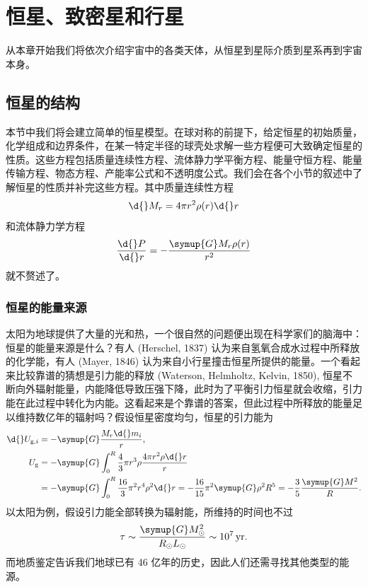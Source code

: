 \documentclass[../天体物理基础.tex]{subfiles}
\begin{document}
\section{恒星、致密星和行星}
从本章开始我们将依次介绍宇宙中的各类天体，从恒星到星际介质到星系再到宇宙本身。

\subsection{恒星的结构}
本节中我们将会建立简单的恒星模型。在球对称的前提下，给定恒星的初始质量，化学组成和边界条件，在某一特定半径的球壳处求解一些方程便可大致确定恒星的性质。这些方程包括质量连续性方程、流体静力学平衡方程、能量守恒方程、能量传输方程、物态方程、产能率公式和不透明度公式。我们会在各个小节的叙述中了解恒星的性质并补完这些方程。其中质量连续性方程
\begin{equation}
\d{}M_{r}=4\pi r^{2}\rho\mleft(r\mright)\d{}r
\end{equation}
和流体静力学方程
\begin{equation}
\frac{\d{}P}{\d{}r}=-\frac{\symup{G}M_{r}\rho\mleft(r\mright)}{r^{2}}\label{2.1.2}
\end{equation}
就不赘述了。

\subsubsection{恒星的能量来源}
太阳为地球提供了大量的光和热，一个很自然的问题便出现在科学家们的脑海中：恒星的能量来源是什么？有人 (Herschel, 1837) 认为来自氢氧合成水过程中所释放的化学能，有人 (Mayer, 1846) 认为来自小行星撞击恒星所提供的能量。一个看起来比较靠谱的猜想是引力能的释放 (Waterson, Helmholtz, Kelvin, 1850), 恒星不断向外辐射能量，内能降低导致压强下降，此时为了平衡引力恒星就会收缩，引力能在此过程中转化为内能。这看起来是个靠谱的答案，但此过程中所释放的能量足以维持数亿年的辐射吗？假设恒星密度均匀，恒星的引力能为
\begin{align}
\d{}U_{\mathrm{g}, i}&=-\symup{G}\frac{M_{r}\d{}m_{i}}{r},\notag\\
U_{\mathrm{g}}&=-\symup{G}\int_{0}^{R}\frac{4}{3}\pi r^{3}\rho\frac{4\pi r^{2}\rho\d{}r}{r}\notag\\
&=-\symup{G}\int_{0}^{R}\frac{16}{3}\pi^{2}r^{4}\rho^{2}\d{}r=-\frac{16}{15}\pi^{2}\symup{G}\rho^{2}R^{5}=-\frac{3}{5}\frac{\symup{G}M^{2}}{R}.
\end{align}
以太阳为例，假设引力能全部转换为辐射能，所维持的时间也不过
\begin{equation}
\tau\sim\frac{\symup{G}M_{\odot}^{2}}{R_{\odot}L_{\odot}}\sim\qty{e7}{yr}.
\end{equation}
而地质鉴定告诉我们地球已有 46 亿年的历史，因此人们还需寻找其他类型的能源。
\end{document}
